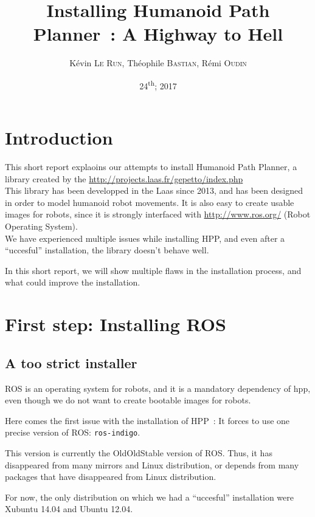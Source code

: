 \documentclass[a4paper, 11pt, titlepage]{article}
\author{Kévin \textsc{Le Run}, Théophile \textsc{Bastian}, Rémi \textsc{Oudin}}
\title{Installing Humanoid Path Planner~: A Highway to Hell}
\date{24\textsuperscript{th}; 2017}
\begin{document}
\maketitle

\tableofcontents

\newpage

\section*{Introduction}
\label{sec:intro}

This short report explaoins our attempts to install Humanoid Path Planner,
a library created by the \url{http://projects.laas.fr/gepetto/index.php}\\

This library has been developped in the Laas since 2013, and has been designed
in order to model humanoid robot movements. It is also easy to create usable
images for robots, since it is strongly interfaced with
\url{http://www.ros.org/} (Robot Operating System).\\

We have experienced multiple issues while installing HPP, and even after a
``uccesful'' installation, the library doesn't behave well.

In this short report, we will show multiple flaws in the installation process,
and what could improve the installation.

\section{First step: Installing ROS}

\subsection{A too strict installer}
ROS is an operating system for robots, and it is a mandatory dependency of hpp,
even though we do not want to create bootable images for robots.

Here comes the first issue with the installation of HPP~: It forces to use one
precise version of ROS\@: \verb|ros-indigo|.

This version is currently the OldOldStable version of ROS\@. Thus, it has
disappeared from many mirrors and Linux distribution, or depends from many
packages that have disappeared from Linux distribution.

For now, the only distribution on which we had a ``uccesful'' installation were
Xubuntu 14.04 and Ubuntu 12.04.
\end{document}
